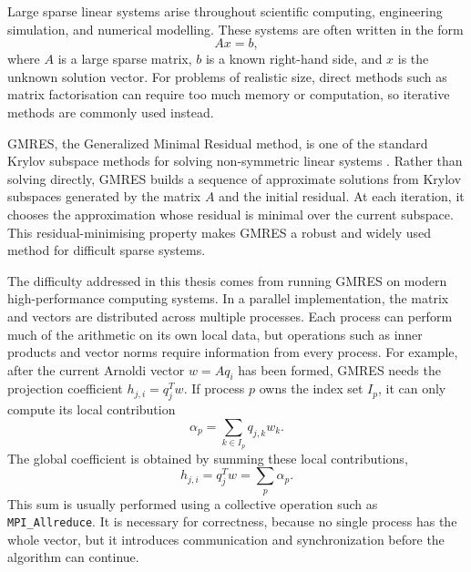 Large sparse linear systems arise throughout scientific computing, engineering simulation, and numerical modelling. These systems are often written in the form
\begin{equation}
    Ax
    =
    b,
    \label{eq:matrix-equation}
\end{equation}
where \(A\) is a large sparse matrix, \(b\) is a known right-hand side, and \(x\) is the unknown solution vector. For problems of realistic size, direct methods such as matrix factorisation can require too much memory or computation, so iterative methods are commonly used instead.

GMRES, the Generalized Minimal Residual method, is one of the standard Krylov subspace methods for solving non-symmetric linear systems \cite{saad-2003,trefethen-1997}. Rather than solving  directly, GMRES builds a sequence of approximate solutions from Krylov subspaces generated by the matrix \(A\) and the initial residual. At each iteration, it chooses the approximation whose residual is minimal over the current subspace. This residual-minimising property makes GMRES a robust and widely used method for difficult sparse systems.

The difficulty addressed in this thesis comes from running GMRES on modern high-performance computing systems. In a parallel implementation, the matrix and vectors are distributed across multiple processes. Each process can perform much of the arithmetic on its own local data, but operations such as inner products and vector norms require information from every process. For example, after the current Arnoldi vector \(w=Aq_i\) has been formed, GMRES needs the projection coefficient \(h_{j,i}=q_j^T w\). If process \(p\) owns the index set \(I_p\), it can only compute its local contribution
\begin{equation}
    \alpha_p
    =
    \sum_{k\in I_p} q_{j,k}w_k.
    \label{eq:local-dot-product}
\end{equation}
The global coefficient is obtained by summing these local contributions,
\begin{equation}
    h_{j,i}
    =
    q_j^T w
    =
    \sum_p \alpha_p.
    \label{eq:global-dot-product}
\end{equation}
This sum is usually performed using a collective operation such as \texttt{MPI\_Allreduce}. It is necessary for correctness, because no single process has the whole vector, but it introduces communication and synchronization before the algorithm can continue.

